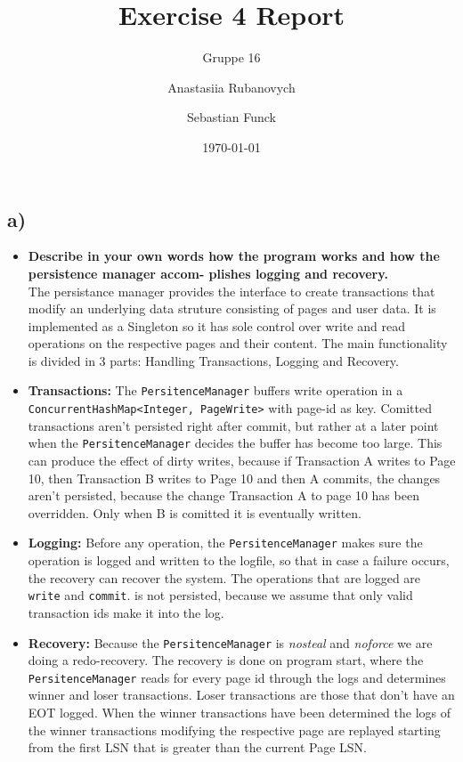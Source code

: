 \documentclass[a4paper,english,abstract=on]{scrartcl}
\title{Exercise 4 Report}
\subtitle{Gruppe 16}
\author{Anastasiia Rubanovych\and Sebastian Funck}
\date{\today}
\begin{document}
\maketitle

\subsection*{a)}
\begin{itemize}
	\item \textbf{Describe in your own words how the program works and how the persistence manager accom-
		plishes logging and recovery.}\\
	
	The persistance manager provides the interface to create transactions that modify an underlying data struture consisting of pages and user data. It is implemented as a Singleton so it has sole control over write and read operations on the respective pages and their content. The main functionality is divided in 3 parts: Handling Transactions, Logging and Recovery.
	
	\item \textbf{Transactions:} The \texttt{PersitenceManager} buffers write operation in a\\ \texttt{ConcurrentHashMap<Integer, PageWrite>} with page-id as key. Comitted transactions aren't persisted right after commit, but rather at a later point when the \texttt{PersitenceManager} decides the buffer has become too large. This can produce the effect of dirty writes, because if Transaction A writes to Page 10, then Transaction B writes to Page 10 and then A commits, the changes aren't persisted, because the change Transaction A to page 10 has been overridden. Only when B is comitted it is eventually written.
	
	\item \textbf{Logging:} Before any operation, the \texttt{PersitenceManager} makes sure the operation is logged and written to the logfile, so that in case a failure occurs, the recovery can recover the system. The operations that are logged are \texttt{write} and \texttt{commit}.  is not persisted, because we assume that only valid transaction ids make it into the log.
	
	\item \textbf{Recovery:} Because the \texttt{PersitenceManager} is \textit{nosteal} and \textit{noforce} we are doing a redo-recovery. The recovery is done on program start, where the \texttt{PersitenceManager} reads for every page id through the logs and determines winner and loser transactions. Loser transactions are those that don't have an EOT logged. When the winner transactions have been determined the logs of the winner transactions modifying the respective page are replayed starting from the first LSN that is greater than the current Page LSN.
\end{itemize}
\end{document}

